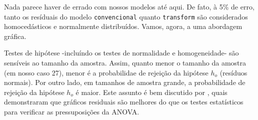 \documentclass[
]{book}
\newenvironment{Shaded}{\begin{snugshade}}{\end{snugshade}}
\newcommand{\DataTypeTok}[1]{\textcolor[rgb]{0.13,0.29,0.53}{#1}}
\newcommand{\FloatTok}[1]{\textcolor[rgb]{0.00,0.00,0.81}{#1}}
\newcommand{\KeywordTok}[1]{\textcolor[rgb]{0.13,0.29,0.53}{\textbf{#1}}}
\newcommand{\NormalTok}[1]{#1}
\newcommand{\OperatorTok}[1]{\textcolor[rgb]{0.81,0.36,0.00}{\textbf{#1}}}
\newcommand{\StringTok}[1]{\textcolor[rgb]{0.31,0.60,0.02}{#1}}
\begin{document}
Nada parece haver de errado com nossos modelos até aqui. De fato, à 5\% de erro, tanto os resíduais do modelo \texttt{convencional} quanto \texttt{transform} são considerados homocedásticos e normalmente distribuídos. Vamos, agora, a uma abordagem gráfica.

\begin{vcsabia}
Testes de hipótese -incluíndo os testes de normalidade e homogeneidade- são sensíveis ao tamanho da amostra. Assim, quanto menor o tamanho da amostra (em nosso caso 27), menor é a probabilidae de rejeição da hipótese \(h_o\) (resíduos normais). Por outro lado, em tamanhos de amostra grande, a probabilidade de rejeição da hipótese \(h_o\) é maior. Este assunto é bem discutido por \citet{Kozak2017}, quais demonstraram que gráficos residuais são melhores do que os testes estatísticos para verificar as pressuposições da ANOVA.
\end{vcsabia}

  

\begin{Shaded}
\end{Shaded}
\end{document}

